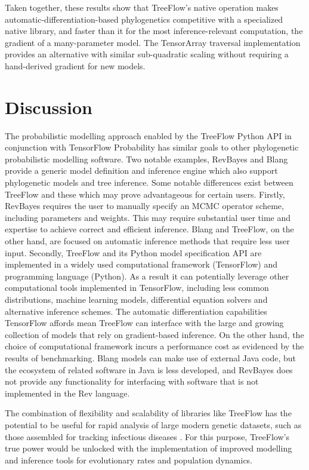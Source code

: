 \documentclass[oupdraft]{sysbio_sse}
\let\cite\citep
\begin{document}
Taken together, these results show that TreeFlow's native operation makes automatic-differentiation-based phylogenetics competitive with a specialized native library, and faster than it for the most inference-relevant computation, the gradient of a many-parameter model. The TensorArray traversal implementation provides an alternative with similar sub-quadratic scaling without requiring a hand-derived gradient for new models.

\section{Discussion}

The probabilistic modelling approach enabled by the TreeFlow Python API in conjunction with TensorFlow Probability has similar goals to other phylogenetic probabilistic modelling software. Two notable examples, RevBayes \cite{hohna2016revbayes} and Blang \cite{bouchard2022blang} provide a generic model definition and inference engine which also support phylogenetic models and tree inference. Some notable differences exist between TreeFlow and these which may prove advantageous for certain users. Firstly, RevBayes requires the user to manually specify an MCMC operator scheme, including parameters and weights. This may require substantial user time and expertise to achieve correct and efficient inference. Blang and TreeFlow, on the other hand, are focused on automatic inference methods that require less user input. Secondly, TreeFlow and its Python model specification API are implemented in a widely used computational framework (TensorFlow) and programming language (Python). As a result it can potentially leverage other computational tools implemented in TensorFlow, including less common distributions, machine learning models, differential equation solvers and alternative inference schemes. The automatic differentiation capabilities TensorFlow affords mean TreeFlow can interface with the large and growing collection of models that rely on gradient-based inference. On the other hand, the choice of computational framework incurs a performance cost as evidenced by the results of benchmarking. Blang models can make use of external Java code, but the ecosystem of related software in Java is less developed, and RevBayes does not provide any functionality for interfacing with software that is not implemented in the Rev language.

The combination of flexibility and scalability of libraries like TreeFlow has the potential to be useful for rapid analysis of large modern genetic datasets, such as those assembled for tracking infectious diseases \cite{hadfield2018nextstrain}. For this purpose, TreeFlow's true power would be unlocked with the implementation of improved modelling and inference tools for evolutionary rates and population dynamics.
\end{document}
